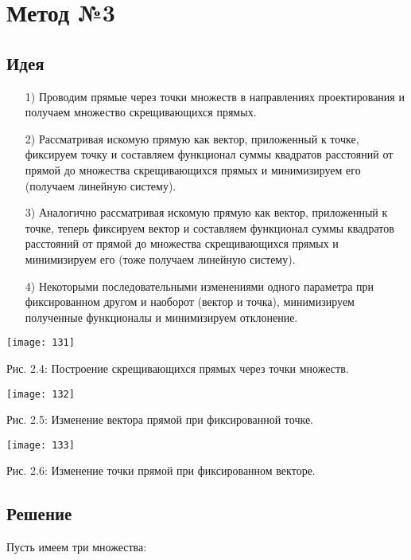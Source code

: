 \section{Метод №3}\label{meth3}

\subsection{Идея}\label{math3:idea}

\begin{itemize}
	\item[1)] Проводим прямые через точки множеств в направлениях проектирования и получаем множество скрещивающихся прямых.
	\item[2)] Рассматривая искомую прямую как вектор, приложенный к точке, фиксируем точку и составляем функционал суммы квадратов расстояний от прямой до множества скрещивающихся прямых и минимизируем его (получаем линейную систему).
	\item[3)] Аналогично рассматривая искомую прямую как вектор, приложенный к точке, теперь фиксируем вектор и составляем функционал суммы квадратов расстояний от прямой до множества скрещивающихся прямых и минимизируем его (тоже получаем линейную систему).
	\item[4)] Некоторыми последовательными изменениями одного параметра при фиксированном другом и наоборот (вектор и точка), минимизируем полученные функционалы и минимизируем отклонение.
\end{itemize}

\begin{center}
	\texttt{[image: 131]}

	Рис. 2.4: Построение скрещивающихся прямых через точки множеств.
\end{center}

\begin{center}
	\texttt{[image: 132]}

	Рис. 2.5: Изменение вектора прямой при фиксированной точке.

	\texttt{[image: 133]}

	Рис. 2.6: Изменение точки прямой при фиксированном векторе.
\end{center}

\subsection{Решение}\label{math3:solution}

Пусть имеем три множества:

